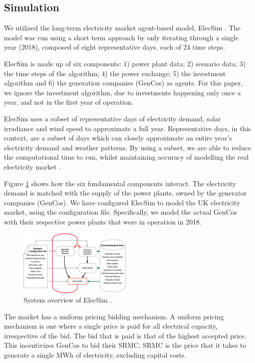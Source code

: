 \documentclass[conference]{IEEEtran}
\begin{document}
\subsection{Simulation}

We utilized the long-term electricity market agent-based model, ElecSim \cite{Kell,Kell2020b}. The model was run using a short term approach by only iterating through a single year (2018), composed of eight representative days, each of 24 time steps.

ElecSim is made up of six components: 1) power plant data; 2) scenario data; 3) the time steps of the algorithm; 4) the power exchange; 5) the investment algorithm and 6) the generation companies (GenCos) as agents. For this paper, we ignore the investment algorithm, due to investments happening only once a year, and not in the first year of operation. 

ElecSim uses a subset of representative days of electricity demand, solar irradiance and wind speed to approximate a full year. Representative days, in this context, are a subset of days which can closely approximate an entire year's electricity demand and weather patterns. By using a subset, we are able to reduce the computational time to run, whilst maintaining accuracy of modelling the real electricity market \cite{Kell2020}.

Figure \ref{fig:model_details} shows how the six fundamental components interact. The electricity demand is matched with the supply of the power plants, owned by the generator companies (GenCos). We have configured ElecSim to model the UK electricity market, using the configuration file. Specifically, we model the actual GenCos with their respective power plants that were in operation in 2018.



\begin{figure}
    \includegraphics[width=0.49\textwidth]{figures/methedology/system-overview-v2}
    \caption{System overview of ElecSim \cite{Kell}.}
    \label{fig:model_details}
\end{figure}

The market has a uniform pricing bidding mechanism. A uniform pricing mechanism is one where a single price is paid for all electrical capacity, irrespective of the bid. The bid that is paid is that of the highest accepted price. This incentivizes GenCos to bid their SRMC. SRMC is the price that it takes to generate a single MWh of electricity, excluding capital costs. 
\end{document}
